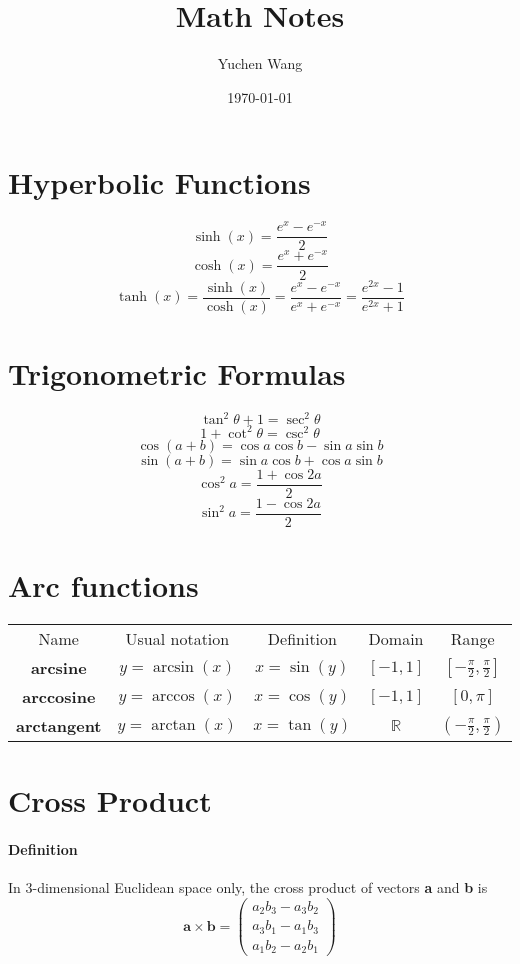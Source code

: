 \documentclass[11pt]{article}
\title{Math Notes}
\author{Yuchen Wang}
\date{\today}
\newcommand{\tb}[1]{\textbf{#1}}
\newcommand{\real}[0]{\mathbb{R}}
\begin{document}
	\maketitle
	\tableofcontents
	\newpage
\section{Hyperbolic Functions} 
$$\sinh(x) = \frac{e^x - e^{-x}}{2}$$
$$\cosh(x) = \frac{e^x + e^{-x}}{2}$$
$$\tanh(x) = \frac{\sinh(x)}{\cosh(x)} = \frac{e^x - e^{-x}}{e^x + e^{-x}} = \frac{e^{2x} - 1}{e^{2x} + 1}$$
\section{Trigonometric Formulas}
$$\tan^2{\theta} + 1 = \sec^2{\theta}$$
$$1 + \cot^2{\theta} = \csc^2{\theta}$$
$$\cos{(a+b)} = \cos{a}\cos{b}-\sin{a}\sin{b}$$
$$\sin{(a+b)} = \sin{a}\cos{b}+\cos{a}\sin{b}$$
$$\cos^2{a} = \frac{1+\cos{2a}}{2} $$
$$\sin^2{a} = \frac{1-\cos{2a}}{2} $$
\section{Arc functions}
\begin{center}
\begin{tabular}{ c c c c c}
 Name & Usual notation & Definition & Domain & Range \\ 
 \tb{arcsine} & $y = \arcsin(x)$ & $x = \sin(y)$ & $[-1, 1]$ & $[-\frac{\pi}{2}, \frac{\pi}{2}] $ \\  
 \tb{arccosine} & $y = \arccos(x)$ & $x = \cos(y)$ & $[-1, 1]$ & $[0, \pi]$   \\
 \tb{arctangent} & $y = \arctan(x)$ & $x = \tan(y)$ & $\real$ & $(-\frac{\pi}{2}, \frac{\pi}{2})$   \\
\end{tabular}
\end{center}

\section{Cross Product}
\paragraph{Definition} In 3-dimensional Euclidean space only, the cross product of vectors \tb{a} and \tb{b} is 
$$\tb{a} \times \tb{b} = \begin{pmatrix}a_2b_3 - a_3b_2\\ a_3b_1-a_1b_3\\a_1b_2-a_2b_1\end{pmatrix}$$ 
\end{document}
